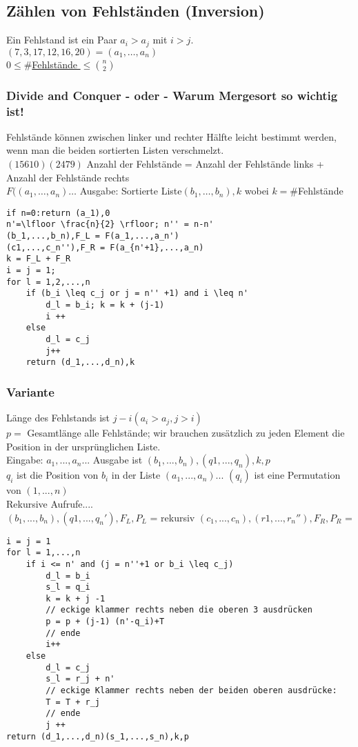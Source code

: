 \subsection{Zählen von Fehlständen (Inversion)}
Ein Fehlstand ist ein Paar $a_i > a_j$ mit $i>j$.\\
$(7,3,17,12,16,20) = (a_1,\dots,a_n)$\\%
\underline{$0\leq \#$Fehlstände $\leq \binom{n}{2}$}
\subsubsection{Divide and Conquer - oder - Warum Mergesort so wichtig ist!}
Fehlstände können zwischen linker und rechter Hälfte leicht bestimmt werden, wenn man die beiden sortierten Listen verschmelzt.\\
$(1 5 6 10)(2 4 7 9)$ 
Anzahl der Fehlstände = Anzahl der Fehlstände links + Anzahl der Fehlstände rechts\\
$F((a_1,\dots,a_n)\dots$ Ausgabe: Sortierte Liste$(b_1,\dots,b_n),k$ wobei $k=\#$Fehlstände\\
\begin{lstlisting}[mathescape]
if n=0:return (a_1),0
n'=\lfloor \frac{n}{2} \rfloor; n'' = n-n'
(b_1,...,b_n),F_L = F(a_1,...,a_n')
(c1,...,c_n''),F_R = F(a_{n'+1},...,a_n)
k = F_L + F_R
i = j = 1;
for l = 1,2,...,n
	if (b_i \leq c_j or j = n'' +1) and i \leq n'
		d_l = b_i; k = k + (j-1)
		i ++
	else
		d_l = c_j
		j++
	return (d_1,...,d_n),k
\end{lstlisting}
\subsubsection{Variante}
Länge des Fehlstands ist $j-i (a_i > a_j, j>i)$\\
$p =$ Gesamtlänge alle Fehlstände; wir brauchen zusätzlich zu jeden Element die Position in der ursprünglichen Liste.\\
Eingabe: $a_1,...,a_n$... Ausgabe ist $(b_1,...,b_n),(q1,...,q_n),k,p$ \\
$q_i$ ist die Position von $b_i$ in der Liste $(a_1,...,a_n)$... $(q_i)$ ist eine Permutation von $(1,...,n)$\\
Rekursive Aufrufe....\\
$(b_1,...,b_n),(q1,...,q_n'),F_L,P_L$ = rekursiv
$(c_1,...,c_n),(r1,...,r_n''),F_R,P_R$ = 
\begin{lstlisting}[mathescape]
i = j = 1
for l = 1,...,n
	if i <= n' and (j = n''+1 or b_i \leq c_j)
		d_l = b_i
		s_l = q_i
		k = k + j -1
		// eckige klammer rechts neben die oberen 3 ausdrücken
		p = p + (j-1) (n'-q_i)+T
		// ende
		i++
	else
		d_l = c_j
		s_l = r_j + n'
		// eckige Klammer rechts neben der beiden oberen ausdrücke:
		T = T + r_j
		// ende
		j ++
return (d_1,...,d_n)(s_1,...,s_n),k,p
\end{lstlisting}

